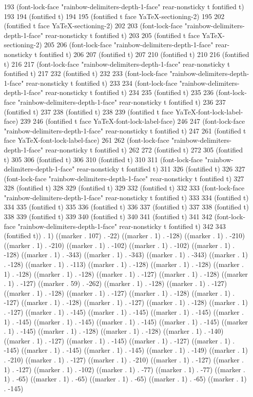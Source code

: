 {193 (font-lock-face "rainbow-delimiters-depth-1-face" rear-nonsticky t fontified t) 193 194 (fontified t) 194 195 (fontified t face YaTeX-sectioning-2) 195 202 (fontified t face YaTeX-sectioning-2) 202 203 (font-lock-face "rainbow-delimiters-depth-1-face" rear-nonsticky t fontified t) 203 205 (fontified t face YaTeX-sectioning-2) 205 206 (font-lock-face "rainbow-delimiters-depth-1-face" rear-nonsticky t fontified t) 206 207 (fontified t) 207 210 (fontified t) 210 216 (fontified t) 216 217 (font-lock-face "rainbow-delimiters-depth-1-face" rear-nonsticky t fontified t) 217 232 (fontified t) 232 233 (font-lock-face "rainbow-delimiters-depth-1-face" rear-nonsticky t fontified t) 233 234 (font-lock-face "rainbow-delimiters-depth-1-face" rear-nonsticky t fontified t) 234 235 (fontified t) 235 236 (font-lock-face "rainbow-delimiters-depth-1-face" rear-nonsticky t fontified t) 236 237 (fontified t) 237 238 (fontified t) 238 239 (fontified t face YaTeX-font-lock-label-face) 239 246 (fontified t face YaTeX-font-lock-label-face) 246 247 (font-lock-face "rainbow-delimiters-depth-1-face" rear-nonsticky t fontified t) 247 261 (fontified t face YaTeX-font-lock-label-face) 261 262 (font-lock-face "rainbow-delimiters-depth-1-face" rear-nonsticky t fontified t) 262 272 (fontified t) 272 305 (fontified t) 305 306 (fontified t) 306 310 (fontified t) 310 311 (font-lock-face "rainbow-delimiters-depth-1-face" rear-nonsticky t fontified t) 311 326 (fontified t) 326 327 (font-lock-face "rainbow-delimiters-depth-1-face" rear-nonsticky t fontified t) 327 328 (fontified t) 328 329 (fontified t) 329 332 (fontified t) 332 333 (font-lock-face "rainbow-delimiters-depth-1-face" rear-nonsticky t fontified t) 333 334 (fontified t) 334 335 (fontified t) 335 336 (fontified t) 336 337 (fontified t) 337 338 (fontified t) 338 339 (fontified t) 339 340 (fontified t) 340 341 (fontified t) 341 342 (font-lock-face "rainbow-delimiters-depth-1-face" rear-nonsticky t fontified t) 342 343 (fontified t)) . 1) ((marker . 107) . -22) ((marker . 1) . -128) ((marker . 1) . -210) ((marker . 1) . -210) ((marker . 1) . -102) ((marker . 1) . -102) ((marker . 1) . -128) ((marker . 1) . -343) ((marker . 1) . -343) ((marker . 1) . -343) ((marker . 1) . -128) ((marker . 1) . -113) ((marker . 1) . -128) ((marker . 1) . -128) ((marker . 1) . -128) ((marker . 1) . -128) ((marker . 1) . -127) ((marker . 1) . -128) ((marker . 1) . -127) ((marker . 59) . -262) ((marker . 1) . -128) ((marker . 1) . -127) ((marker . 1) . -128) ((marker . 1) . -127) ((marker . 1) . -128) ((marker . 1) . -127) ((marker . 1) . -128) ((marker . 1) . -127) ((marker . 1) . -128) ((marker . 1) . -127) ((marker . 1) . -145) ((marker . 1) . -145) ((marker . 1) . -145) ((marker . 1) . -145) ((marker . 1) . -145) ((marker . 1) . -145) ((marker . 1) . -145) ((marker . 1) . -145) ((marker . 1) . -128) ((marker . 1) . -128) ((marker . 1) . -140) ((marker . 1) . -127) ((marker . 1) . -145) ((marker . 1) . -127) ((marker . 1) . -145) ((marker . 1) . -145) ((marker . 1) . -145) ((marker . 1) . -149) ((marker . 1) . -210) ((marker . 1) . -127) ((marker . 1) . -210) ((marker . 1) . -127) ((marker . 1) . -127) ((marker . 1) . -102) ((marker . 1) . -77) ((marker . 1) . -77) ((marker . 1) . -65) ((marker . 1) . -65) ((marker . 1) . -65) ((marker . 1) . -65) ((marker . 1) . -145) }
